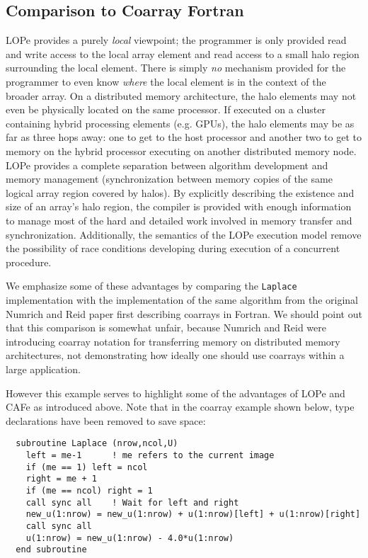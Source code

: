 \subsection{Comparison to Coarray Fortran}

LOPe provides a purely \emph{local} viewpoint; the programmer is only provided read and write access
to the local array element and read access to a small halo region surrounding the local element.
There is simply \emph{no} mechanism provided for the programmer to even know \emph{where} the local
element is in the context of the broader array.  On a distributed memory architecture, the halo
elements may not even be physically located on the same processor.  If executed on a cluster
containing hybrid processing elements (e.g. GPUs), the halo elements may be as far as three hops
away: one to get to the host processor and another two to get to memory on the hybrid processor
executing on another distributed memory node.  LOPe provides a complete separation between algorithm
development and memory management (synchronization between memory copies of the same logical
array region covered by halos).  By explicitly describing the existence and size of an array's halo
region, the compiler is provided with enough information to manage most of the hard and detailed
work involved in memory transfer and synchronization.  Additionally, the semantics of the LOPe
execution model remove the possibility of race conditions developing during execution of a
concurrent procedure.

We emphasize some of these advantages by comparing the \texttt{Laplace} implementation with the
implementation of the same algorithm from the original Numrich and Reid
paper\cite{Numrich:1998:CFP:289918.289920} first describing coarrays in Fortran.  We should point
out that this comparison is somewhat unfair, because Numrich and Reid were introducing coarray
notation for transferring memory on distributed memory architectures, not demonstrating how ideally
one should use coarrays within a large application.

However this example serves
to highlight some of the advantages of LOPe and CAFe as introduced above.  Note that in the coarray
example shown below, type declarations have been removed to save space:
{\small \begin{verbatim}
  subroutine Laplace (nrow,ncol,U)
    left = me-1      ! me refers to the current image
    if (me == 1) left = ncol
    right = me + 1
    if (me == ncol) right = 1
    call sync all    ! Wait for left and right
    new_u(1:nrow) = new_u(1:nrow) + u(1:nrow)[left] + u(1:nrow)[right]
    call sync all
    u(1:nrow) = new_u(1:nrow) - 4.0*u(1:nrow)
  end subroutine
\end{verbatim}}

